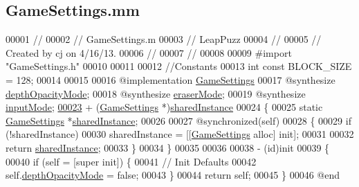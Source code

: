 \hypertarget{_game_settings_8mm}{\subsection{Game\-Settings.\-mm}
\label{d3/d8d/_game_settings_8mm}
}

\begin{DoxyCode}
00001 \textcolor{comment}{//}
00002 \textcolor{comment}{//  GameSettings.m}
00003 \textcolor{comment}{//  LeapPuzz}
00004 \textcolor{comment}{//}
00005 \textcolor{comment}{//  Created by cj on 4/16/13.}
00006 \textcolor{comment}{//}
00007 \textcolor{comment}{//}
00008 
00009 \textcolor{preprocessor}{#import "GameSettings.h"}
00010 
00011 
00012 \textcolor{comment}{//Constants}
00013 \textcolor{keywordtype}{int} \textcolor{keyword}{const}  BLOCK\_SIZE = 128;
00014 
00015 
00016 \textcolor{keyword}{@implementation }\hyperlink{interface_game_settings}{GameSettings}
00017 \textcolor{keyword}{@synthesize} \hyperlink{interface_game_settings_a1ac5ddcb61e46f952ccd0e876a8578a4}{depthOpacityMode};
00018 \textcolor{keyword}{@synthesize} \hyperlink{interface_game_settings_ab192ff4717d84e69f4e3a32a4e38d6b8}{eraserMode};
00019 \textcolor{keyword}{@synthesize} \hyperlink{interface_game_settings_a57e428fbdeeb3dbffa09bb7ffcf6b057}{inputMode};
\hypertarget{_game_settings_8mm_source_l00023}{}\hyperlink{interface_game_settings_abdcc2e77ea14381a85c6de67c83df624}{00023} + (\hyperlink{interface_game_settings}{GameSettings} *)\hyperlink{interface_game_settings_abdcc2e77ea14381a85c6de67c83df624}{sharedInstance}
00024 \{
00025     \textcolor{keyword}{static} \hyperlink{interface_game_settings}{GameSettings} *\hyperlink{interface_game_settings_abdcc2e77ea14381a85c6de67c83df624}{sharedInstance};
00026     
00027     @\textcolor{keyword}{synchronized}(\textcolor{keyword}{self})
00028     \{
00029         \textcolor{keywordflow}{if} (!sharedInstance)
00030             sharedInstance = [[\hyperlink{interface_game_settings}{GameSettings} alloc] init];
00031         
00032         \textcolor{keywordflow}{return} \hyperlink{interface_game_settings_abdcc2e77ea14381a85c6de67c83df624}{sharedInstance};
00033     \}
00034 \}
00035 
00036 
00038 - (id)init
00039 \{
00040     \textcolor{keywordflow}{if} (\textcolor{keyword}{self} = [super init]) \{
00041         \textcolor{comment}{// Init Defaults}
00042         \textcolor{keyword}{self}.\hyperlink{interface_game_settings_a1ac5ddcb61e46f952ccd0e876a8578a4}{depthOpacityMode} = \textcolor{keyword}{false};
00043     \}
00044     \textcolor{keywordflow}{return} \textcolor{keyword}{self};
00045 \}
00046 \textcolor{keyword}{@end}
\end{DoxyCode}
